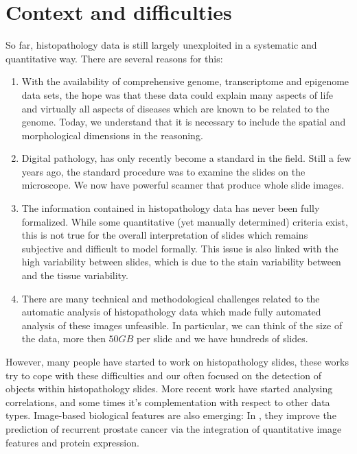 \documentclass[a4paper,10pt,twocolumn]{article}
\begin{document}
\section{Context and difficulties}

So far, histopathology data is still largely unexploited in a systematic and
quantitative way. There are several reasons for this: 

\begin{enumerate}
\item With the
availability of comprehensive genome, transcriptome and epigenome data
sets, the hope was that these data could explain many aspects of life
and virtually all aspects of diseases which are known to be related to
the genome. Today, we understand that it is necessary to include the spatial and
morphological dimensions in the reasoning. 
\item Digital pathology,
has only recently become a standard in the field. Still a few years
ago, the standard
procedure was to examine the slides on the
microscope. We now have powerful scanner that produce whole slide images.
\item The information
contained in histopathology data has never been fully
formalized. While some quantitative (yet manually determined) criteria
exist, this is not true for the overall interpretation of slides
which remains subjective and difficult to model formally. This issue is also linked with the high variability between slides, which is due to the stain variability between and the tissue variability. 
\item There are many technical and methodological challenges related
  to the automatic analysis of histopathology data which made fully
  automated analysis of these images unfeasible. In particular, we can think of the size of the data, more then $50GB$ per slide and we have hundreds of slides.
\end{enumerate}
However, many people have started to work on histopathology slides, these works try to cope
 with these difficulties and our often focused on the detection of objects within histopathology slides. More recent work 
 have started analysing correlations, and some times it's complementation with respect to 
 other data types. Image-based biological features are also emerging: In \citet{lee2015supervised}, 
 they improve the prediction of recurrent prostate cancer via the integration of quantitative 
 image features and protein expression. 
\end{document}
